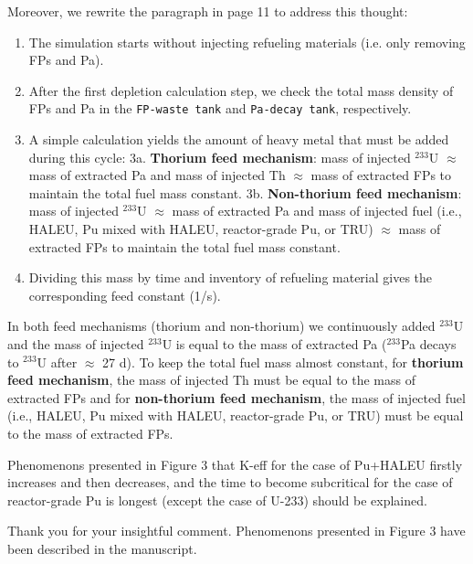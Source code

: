 \documentclass[answers,11pt]{exam}
\begin{document}
\begin{questions}
\begin{solution}
               Moreover, we rewrite the paragraph in page 11 to address this thought:\\
               \begin{enumerate}
               	\item The simulation starts without injecting refueling materials (i.e. only removing FPs and Pa).
               	\item After the first depletion calculation step, we check the total mass density of FPs and Pa in the \texttt{FP-waste tank} and \texttt{Pa-decay tank}, respectively.
               	\item A simple calculation yields the amount of heavy metal that must be added during this cycle:
               	\subitem 3a. \textbf{Thorium feed mechanism}: mass of injected $^{233}$U $\approx$ mass of extracted Pa and mass of injected Th $\approx$ mass of extracted FPs to maintain the total fuel mass constant.
               	\subitem 3b. \textbf{Non-thorium feed mechanism}: mass of injected $^{233}$U $\approx$ mass of extracted Pa and mass of injected fuel (i.e., HALEU, Pu mixed with HALEU, reactor-grade Pu, or TRU) $\approx$ mass of extracted FPs to maintain the total fuel mass constant.
               	\item Dividing this mass by time and inventory of refueling material gives the corresponding feed constant (1/s).
               \end{enumerate}
               In both feed mechanisms (thorium and non-thorium) we continuously added $^{233}$U and the mass of injected $^{233}$U is equal to the mass of extracted Pa ($^{233}$Pa decays to $^{233}$U after $\approx$ 27 d). To keep the total fuel mass almost constant, for \textbf{thorium feed mechanism}, the mass of injected Th must be equal to the mass of extracted FPs and for \textbf{non-thorium feed mechanism}, the mass of injected fuel (i.e., HALEU, Pu mixed with HALEU, reactor-grade Pu, or TRU) must be equal to the mass of extracted FPs.
               
        \end{solution}


        \question Phenomenons presented in Figure 3 that K-eff for the case of Pu+HALEU firstly increases and then decreases, and the time to become subcritical for the case of reactor-grade Pu is longest (except the case of U-233) should be explained.
        \begin{solution}
                 Thank you for your insightful comment. Phenomenons presented in Figure 3 have been described in the manuscript.
                 

\end{solution}
\end{questions}
\end{document}
